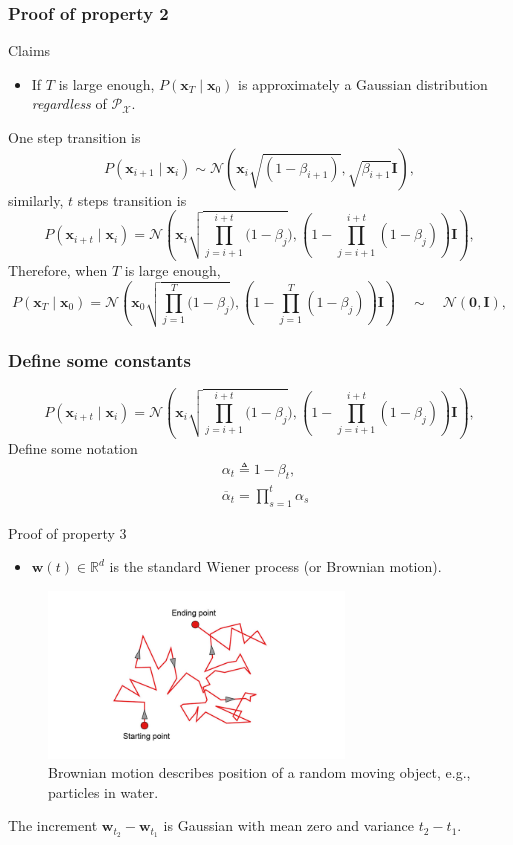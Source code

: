 \documentclass[10pt,xcolor={usenames,dvipsnames,table},aspectratio=169]{beamer}
\begin{document}
\begin{frame}
\frametitle{Proof of property 2} 

\begin{block}{Claims}
    \begin{itemize}
        \item If $T$ is large enough, $P(\bm{x}_T \mid \bm{x}_0)$ is approximately a Gaussian distribution \textit{regardless} of $\mathcal{P}_{\mathcal{X}}$.
    \end{itemize}
\end{block}
One step transition is
\[
P(\bm{x}_{i+1} \mid \bm{x}_{i}) \sim \mathcal{N}(\bm{x}_{i} \sqrt{(1-\beta_{i+1})} , \sqrt{\beta_{i+1}} \bm{I}),
\]
similarly, $t$ steps transition is
\[
P(\bm{x}_{i+t} \mid \bm{x}_i) 
= \mathcal{N}\left( \bm{x}_i \sqrt{\prod_{j=i+1}^{i+t}(1-\beta_j}) , \left(  1 - \prod_{j=i+1}^{i+t} (1-\beta_j)\right) \bm{I} \right),
\] 
Therefore, when $T$ is large enough,
\[
P(\bm{x}_T \mid \bm{x}_0) = 
\mathcal{N}\left( \bm{x}_0 \sqrt{\prod_{j=1}^{T}(1-\beta_j}) , \left(  1 - \prod_{j=1}^{T} (1-\beta_j)\right) \bm{I} \right) \quad \sim \quad \mathcal{N}(\bm{0}, \bm{I}),
\] 
\end{frame}
\begin{frame}
\frametitle{Define some constants} 
\[
P(\bm{x}_{i+t} \mid \bm{x}_i) 
= \mathcal{N}\left( \bm{x}_i \sqrt{\prod_{j=i+1}^{i+t}(1-\beta_j}) , \left(  1 - \prod_{j=i+1}^{i+t} (1-\beta_j)\right) \bm{I} \right),
\] 
Define some notation
\begin{align*}
&\alpha_t \triangleq 1- \beta_t, \\
&\overline{\alpha}_t = \prod_{s=1}^{t} \alpha_s
\end{align*}

\end{frame}
\begin{frame}{Proof of property 3}
\begin{itemize}
    \item $\bm{w}(t) \in \mathbb{R}^{d}$ is the standard Wiener process (or Brownian motion).

\end{itemize}
\begin{figure}
    \centering
    \includegraphics[width=0.7\textwidth]{figures/brownian.png}
    \caption{Brownian motion describes position of a random moving object, e.g., particles in water.}
\end{figure}
The increment $\bm{w}_{t_2} - \bm{w}_{t_1}$ is Gaussian with mean zero and variance $t_2 - t_1$.
\end{frame}
\end{document}
